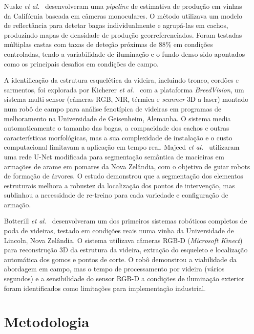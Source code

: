 \documentclass[12pt, a4paper]{article}
\begin{document}
Nuske \textit{et al.}~\cite{nuske2011estimating} desenvolveram uma
\textit{pipeline} de estimativa de produção em vinhas da Califórnia
baseada em câmeras monoculares. O método utilizava um modelo de
reflectância para detetar bagas individualmente e agrupá-las em cachos,
produzindo mapas de densidade de produção georreferenciados. Foram
testadas múltiplas castas com taxas de deteção próximas de 88\% em
condições controladas, tendo a variabilidade de iluminação e o fundo
denso sido apontados como os principais desafios em condições de campo.

A identificação da estrutura esquelética da videira, incluindo tronco, cordões e
sarmentos, foi explorada por Kicherer \textit{et
al.}~\cite{kicherer2015automatic} com a plataforma \textit{BreedVision},
um sistema multi-sensor (câmeras RGB, NIR, térmica e \textit{scanner} 3D
a laser) montado num robô de campo para análise fenotípica de videiras em
programas de melhoramento na Universidade de Geisenheim, Alemanha. O
sistema media automaticamente o tamanho das bagas, a compacidade dos
cachos e outras características morfológicas, mas a sua complexidade de
instalação e o custo computacional limitavam a aplicação em tempo real.
Majeed \textit{et al.}~\cite{majeed2020deep} utilizaram uma rede U-Net
modificada para segmentação semântica de macieiras em armações de arame em
pomares da Nova Zelândia, com o objetivo de guiar robots de formação de
árvores. O estudo demonstrou que a segmentação dos elementos estruturais
melhora a robustez da localização dos pontos de intervenção, mas sublinhou
a necessidade de re-treino para cada variedade e configuração de armação.

Botterill \textit{et al.}~\cite{botterill2017robot} desenvolveram um dos
primeiros sistemas robóticos completos de poda de videiras, testado em
condições reais numa vinha da Universidade de Lincoln, Nova Zelândia. O
sistema utilizava câmeras RGB-D (\textit{Microsoft Kinect}) para
reconstrução 3D da estrutura da videira, extração do esqueleto e
localização automática dos gomos e pontos de corte. O robô demonstrou a
viabilidade da abordagem em campo, mas o tempo de processamento por videira
(vários segundos) e a sensibilidade do sensor RGB-D a condições de
iluminação exterior foram identificados como limitações para implementação
industrial.

\section{Metodologia}
\end{document}
